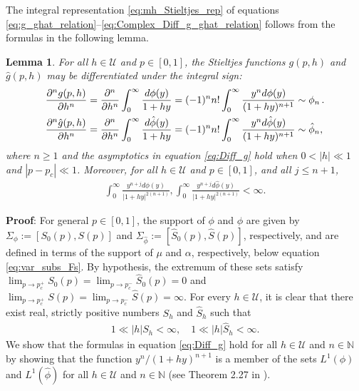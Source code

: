 \documentclass[english,12pt]{ttuthes}
\newtheorem{lemma}{Lemma}[chapter]
\newcommand{\ph}{\hat{\phi}}
\begin{document}
The integral representation \eqref{eq:mh_Stieltjes_rep} of equations
\eqref{eq:g_ghat_relation}--\eqref{eq:Complex_Diff_g_ghat_relation}
follows from the formulas in the following lemma.
\begin{lemma}\label{lem:h_diff_commutation}  
  For all $h\in\mathcal{U}$ and $p\in[0,1]$, the Stieltjes functions
  $g(p,h)$ and $\hat{g}(p,h)$ may be differentiated under the integral
  sign: 
  \begin{align}\label{eq:Diff_g}
    \frac{\partial^ng(p,h)}{\partial h^n}&=\frac{\partial^n}{\partial h^n}\int_0^\infty\frac{d\phi(y)}{1+hy}
                     =(-1)^nn!\int_0^\infty\frac{y^nd\phi(y)}{(1+hy)^{n+1}}\sim\phi_n\,.
         \\
    \frac{\partial^n\hat{g}(p,h)}{\partial h^n}&=\frac{\partial^n}{\partial h^n}\int_0^\infty\frac{d\ph(y)}{1+hy}
                     =(-1)^nn!\int_0^\infty\frac{y^nd\ph(y)}{(1+hy)^{n+1}}\sim\ph_n,
           \notag           
  \end{align}
  where $n\geq1$ and the asymptotics in equation \eqref{eq:Diff_g} hold when
  $0<|h|\ll1$ and $|p-p_c|\ll1$. Moreover, for all $h\in\mathcal{U}$ and
  $p\in[0,1]$, and all $j\leq n+1$,
  \begin{align}\label{eq:Complex_Diff_g_bounds}
   \int_0^\infty\frac{y^{n+j}d\phi(y)}{|1+hy|^{2(n+1)}},
   \int_0^\infty\frac{y^{n+j}d\ph(y)}{|1+hy|^{2(n+1)}}<\infty.
  \end{align}
\end{lemma}
%
\noindent \textbf{Proof}:
%
For general $p\in[0,1]$, the support of $\phi$ and $\ph$ are given by
$\Sigma_\phi:=[S_0(p),S(p)]$ and $\Sigma_{\ph}:=[\hat{S}_0(p),\hat{S}(p)]$,
respectively, and are defined in terms of the support of $\mu$ and $\alpha$,
respectively, below equation \eqref{eq:var_subs_Fs}. By hypothesis, the
extremum of these sets satisfy
$\lim_{p\to p_c^+}S_0(p)=\lim_{p\to p_c^-}\hat{S}_0(p)=0$ and
$\lim_{p\to p_c^+}S(p)=\lim_{p\to p_c^-}\hat{S}(p)=\infty$. For every
$h\in\mathcal{U}$, it is clear that there exist real, strictly positive
numbers $S_h$ and $\hat{S}_h$ such that 
%
\begin{align}\label{eq:S1_asymp}
  1\ll|h|S_h<\infty, \quad 1\ll|h|\hat{S}_h<\infty.
\end{align}
%
We show that the formulas in equation \eqref{eq:Diff_g} hold for all
$h\in\mathcal{U}$ and $n\in\mathbb{N}$ by showing that the function
$y^n/(1+hy)^{n+1}$ is a member of the sets $L^1(\phi)$ and $L^1(\ph)$ for
all $h\in\mathcal{U}$ and $n\in\mathbb{N}$ (see Theorem 2.27 in
\cite{Folland:95}).   
\end{document}
